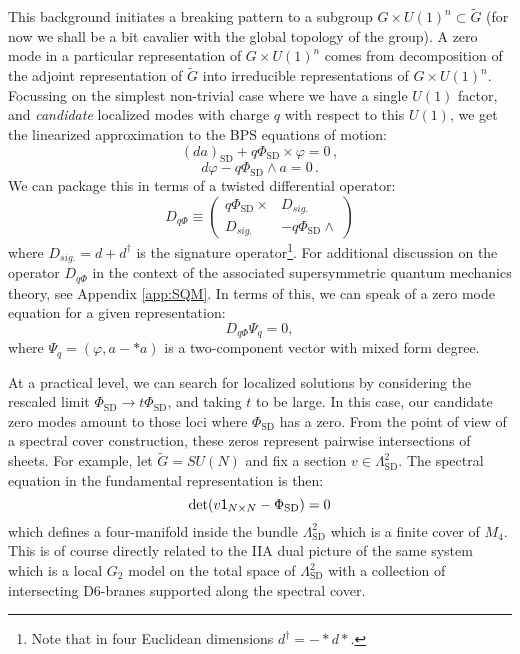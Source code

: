 \documentclass[12pt]{article}%
\numberwithin{equation}{section}
\renewcommand{\(}{\left(}
\renewcommand{\)}{\right)}
\renewcommand{\[}{\left[}
\renewcommand{\]}{\right]}
\begin{document}
This background initiates a breaking pattern to a subgroup $G \times U(1)^{n} \subset \widetilde{G}$ (for now we shall be a bit cavalier with the global topology of the group). A zero mode in a particular representation of $G \times U(1)^n$ comes from decomposition of the adjoint representation of $\widetilde{G}$ into irreducible representations of $G \times U(1)^n$. Focussing on the simplest non-trivial case where we have a single $U(1)$ factor, and \textit{candidate} localized modes with charge $q$ with respect to this $U(1)$, we get the linearized approximation to the BPS equations of motion:
\begin{equation}\label{zmeqab}
(da)_{\mathrm{SD}} + q\Phi_{\mathrm{SD}}\times \varphi=0\,,
\end{equation}
\begin{equation}
d\varphi-q\Phi_{\mathrm{SD}}\wedge a=0\,.
\end{equation}
We can package this in terms of a twisted differential operator:
\begin{equation}
D_{q\Phi} \equiv \begin{pmatrix}
q\Phi_{\mathrm{SD}}\times & D_{sig.} \\
D_{sig.} & -q\Phi_{\mathrm{SD}}\wedge
\end{pmatrix}
\end{equation}
where $D_{sig.}=d+d^\dagger$ is the signature operator\footnote{Note that in four Euclidean dimensions $d^\dagger=-*d*$.}.
For additional discussion on the operator $D_{q\Phi}$ in the context of the associated supersymmetric quantum
mechanics theory, see Appendix \ref{app:SQM}. In terms of this, we can speak of a zero mode equation for a given representation:
\begin{equation}
D_{q \Phi} \Psi_{q} = 0,
\end{equation}
where $\Psi_q = (\varphi , a - \ast a)$ is a two-component vector with mixed form degree.

At a practical level, we can search for localized solutions by considering the rescaled limit $\Phi_{\mathrm{SD}} \rightarrow t \Phi_{\mathrm{SD}}$, and taking $t$ to be large. In this case, our candidate zero modes amount to those loci where $\Phi_{\mathrm{SD}}$ has a zero. From the point of view of a spectral cover construction, these zeros represent pairwise intersections of sheets. For example, let $\widetilde{G}=SU(N)$ and fix a
section $v\in\Lambda^2_{\mathrm{SD}}$.
The spectral equation in the fundamental representation is then:
\begin{equation}
\textnormal{det}(v\mathsf{1}_{N\times N}-\Phi_{\mathrm{SD}})=0
\end{equation}
which defines a four-manifold inside the bundle $\Lambda^2_{\mathrm{SD}}$ which is a finite cover of $M_4$. This is of course directly related to the IIA dual picture of the same system which is a local $G_2$ model on the total space of $\Lambda^2_{\mathrm{SD}}$ with a collection of intersecting D6-branes supported along the spectral cover.
\end{document}
